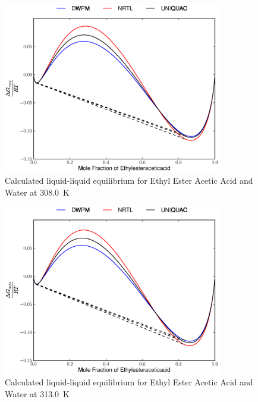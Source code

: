 \begin{figure}[hp]
\centering
\includegraphics[width = 0.85\textwidth]{Results_Parts/BinaryParams/ethylesteraceticacid-water/AllModelsGibbsPlots/T_308.0.eps}
\caption{Calculated liquid-liquid equilibrium for Ethyl Ester Acetic Acid and Water at 308.0~$\mathrm{K}$}
\end{figure}

\begin{figure}[hp]
\centering
\includegraphics[width = 0.85\textwidth]{Results_Parts/BinaryParams/ethylesteraceticacid-water/AllModelsGibbsPlots/T_313.0.eps}
\caption{Calculated liquid-liquid equilibrium for Ethyl Ester Acetic Acid and Water at 313.0~$\mathrm{K}$}
\end{figure}

\clearpage


